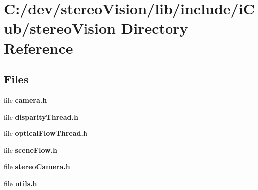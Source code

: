 \section{C\+:/dev/stereo\+Vision/lib/include/i\+Cub/stereo\+Vision Directory Reference}
\label{dir_50bad1a883b2386a62f50ea4f4f2f861}
\subsection*{Files}
\begin{DoxyCompactItemize}
\item 
file {\bfseries camera.\+h}
\item 
file {\bfseries disparity\+Thread.\+h}
\item 
file {\bfseries optical\+Flow\+Thread.\+h}
\item 
file {\bfseries scene\+Flow.\+h}
\item 
file {\bfseries stereo\+Camera.\+h}
\item 
file {\bfseries utils.\+h}
\end{DoxyCompactItemize}
